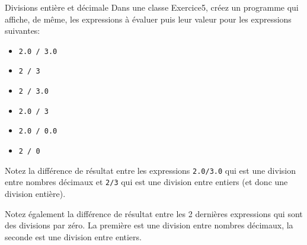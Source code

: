 \documentclass[a4paper,11pt]{article}
\begin{document}
	\begin{Exercice}{Divisions entière et décimale}
		Dans une classe Exercice5, créez un programme qui affiche, de même, les 
		expressions à évaluer puis leur valeur pour les expressions suivantes:
	
		\begin{itemize}		
			\item \texttt{2.0 / 3.0}
			\item \texttt{2 / 3}
			\item \texttt{2 / 3.0}
			\item \texttt{2.0 / 3}
			\item \texttt{2.0 / 0.0}
			\item \texttt{2 / 0}
		\end{itemize}
	
		Notez la différence de résultat entre les expressions \texttt{2.0/3.0} qui est une division entre nombres décimaux 
		et \texttt{2/3} qui est une division entre entiers (et donc une division entière).
	
		Notez également la différence de résultat entre les 2 dernières expressions qui sont des divisions par zéro.
		La première est une division entre nombres décimaux,
		la seconde est une division entre entiers.
	\end{Exercice}
%
\end{document}

